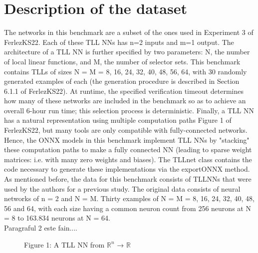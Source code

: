 \documentclass[12pt,a4paper]{report}
\newcommand\tab[1][5mm]{\hspace*{#1}}
\theoremstyle{definition}
\theoremstyle{remark}
\begin{document}
\chapter{Description of the dataset}
\tab The networks in this benchmark are a subset of the ones used in Experiment 3 of FerlezKS22\cite{tll_fast_algorithm}. Each of these TLL NNs has n=2 inputs and m=1 output. The architecture of a TLL NN is further specified by two parameters: N, the number of local linear functions, and M, the number of selector sets. This benchmark contains TLLs of sizes N = M = 8, 16, 24, 32, 40, 48, 56, 64, with 30 randomly generated examples of each (the generation procedure is described in Section 6.1.1 of FerlezKS22\cite{tll_fast_algorithm}). At runtime, the specified verification timeout determines how many of these networks are included in the benchmark so as to achieve an overall 6-hour run time; this selection process is deterministic. Finally, a TLL NN has a natural representation using multiple computation paths Figure 1 of FerlezKS22\cite{tll_fast_algorithm}, but many tools are only compatible with fully-connected networks. Hence, the ONNX models in this benchmark implement TLL NNs by "stacking" these computation paths to make a fully connected NN (leading to sparse weight matrices: i.e. with many zero weights and biases). The TLLnet\cite{tll_net} class contains the code necessary to generate these implementations via the exportONNX method.\cite{tll_git}\\
As mentioned before, the data for this benchmark consists of TLLNNs that were used by the authors for a previous study. The original data consists of neural networks of n = 2 and N = M. Thirty examples of N = M = 8, 16, 24, 32, 40, 48, 56 and 64, with each size having a common neuron count from 256 neurons at N = 8 to 163.834 neurons at N = 64. \\

Paragraful 2 este fain....



\begin{figure}[H]
\centering
{}
\caption{Figure 1: A TLL NN from \(\mathbb{R}^n\) → \(\mathbb{R}\)\cite{relu_architecture}}
\label{fig:relu_architecture}
\end{figure}
\end{document}
